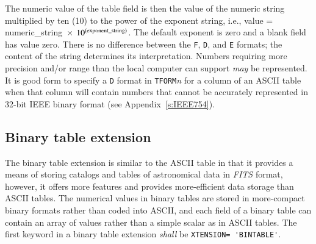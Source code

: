 \documentclass[onecolumn]{aa}
\begin{document}
   The numeric value of the table field is then the value of the numeric
   string multiplied by ten (10) to the power of the exponent string,
   i.e., 
   value = numeric\_string~$\times$ $10^{\rm (exponent\_string)}$.  The
   default exponent is zero and a blank field has value zero.  There is
   no difference between the {\tt F}, {\tt D}, and {\tt E} formats; the
   content of the string determines its interpretation.  Numbers
   requiring more precision and/or range than the local computer can
   support {\em may} be represented.  It is good form to specify a {\tt D}
   format in {\tt TFORM}{\it n} for a column of an ASCII table when that
   column will contain numbers that cannot be accurately represented in
   32-bit IEEE binary format (see Appendix~\ref{s:IEEE754}).
    

                            
  \subsection{Binary table extension}
     \label{s:BTabl}
     
The binary table extension is similar to the ASCII
table in that it provides a means of storing catalogs and tables of
astronomical data in {\em FITS\/} format, however, it offers more
features and provides more-efficient data storage than ASCII tables.
The numerical values in binary tables are stored in more-compact 
binary formats rather than coded into ASCII, and each
field of a binary table can contain an array of values rather
than a simple scalar as in ASCII tables.
The first keyword in a binary table extension {\em shall}
be {\verb*+XTENSION= 'BINTABLE'+}.  
\end{document}
